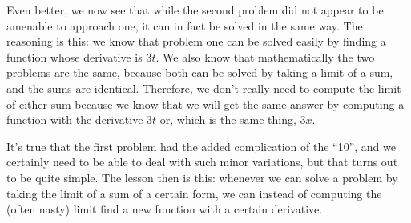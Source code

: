 Even better, we now see that while the second problem did not appear
to be amenable to approach one, it can in fact be solved in the same
way. The reasoning is this: we know that problem one can be solved
easily by finding a function whose derivative is $3t$. We also know
that mathematically the two problems are the same, because both can be
solved by taking a limit of a sum, and the sums are
identical. Therefore, we don't really need to compute the limit of
either sum because we know that we will get the same answer by
computing a function with the derivative $3t$ or, which is the same
thing, $3x$.

It's true that the first problem had the added complication of the
``10'', and we certainly need to be able to deal with such minor
variations, but that turns out to be quite simple. The lesson then is
this: whenever we can solve a problem by taking the limit of a sum of
a certain form, we can instead of computing the (often nasty) limit
find a new function with a certain derivative.

